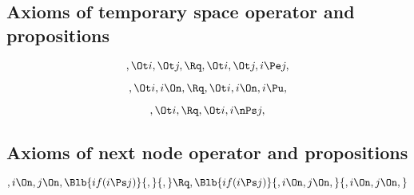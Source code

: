 \bigskip
\bigskip
\bigskip
\bigskip
\subsection{ Axioms of  temporary space operator and propositions}
\[, \Ot i, \Ot j, \Rq , \Ot i, \Ot j, i \Pe j,\]

\[, \Ot i, i \On, \Rq , \Ot i, i \On, i \Pu,\]

\[,\Ot i, \Rq , \Ot i, i \nPs j,\]


\bigskip
\bigskip
\bigskip
\bigskip
\subsection{ Axioms of next node operator and propositions}
\[,i \On, j \On, \Blb{if(i \Ps j)}{,}{,} \Rq , \Blb{if(i \Ps j)}{,i \On, j \On,}{,i \On, j \On,}\]

\newpage











